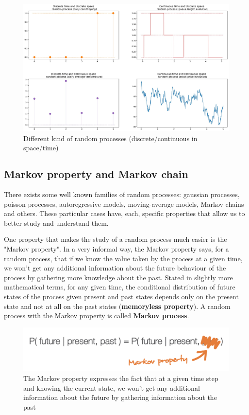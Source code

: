 \begin{figure}[h]
    \centering
\includegraphics[width=\textwidth]{pic/p05c06-snip01.png}
    \caption{Different kind of random processes (discrete/continuous in space/time)}
    \label{fig:p05c06-snip01}
\end{figure}


\subsection{Markov property and Markov chain}

There exists some well known families of random processes: gaussian processes, poisson processes, autoregressive models, moving-average models, Markov chains and others. These particular cases have, each, specific properties that allow us to better study and understand them.

One property that makes the study of a random process much easier is the "Markov property". In a very informal way, the Markov property says, for a random process, that if we know the value taken by the process at a given time, we won't get any additional information about the future behaviour of the process by gathering more knowledge about the past. Stated in slightly more mathematical terms, for any given time, the conditional distribution of future states of the process given present and past states depends only on the present state and not at all on the past states (\textbf{memoryless property}). A random process with the Markov property is called \textbf{Markov process}.



\begin{figure}[h]
    \centering
\includegraphics[width=\textwidth]{pic/p05c06-snip02.png}
    \caption[The Markov does not learn about the future by gathering information about the past]{The Markov property expresses the fact that at a given time step and knowing the current state, we won't get any additional information about the future by gathering information about the past}
    \label{fig:p05c06-snip02}
\end{figure}




